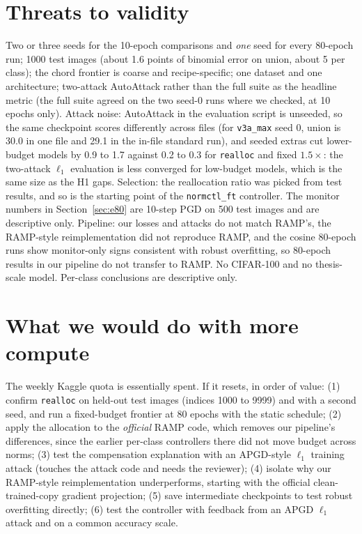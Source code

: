\documentclass[11pt]{article}
\begin{document}
\section{Threats to validity}
Two or three seeds for the 10-epoch comparisons and \emph{one} seed for every 80-epoch run; 1000 test images (about 1.6 points of binomial error on union, about 5 per class); the chord frontier is coarse and recipe-specific;
one dataset and one architecture; two-attack AutoAttack rather than the full suite as the headline metric (the full suite agreed on the two seed-0 runs where we checked, at 10 epochs only).
Attack noise: AutoAttack in the evaluation script is unseeded, so the same checkpoint scores differently across files (for \texttt{v3a\_max} seed 0, union is 30.0 in one file and 29.1 in the in-file standard run), and seeded extras cut lower-budget models by 0.9 to 1.7 against 0.2 to 0.3 for \texttt{realloc} and fixed $1.5\times$: the two-attack $\ell_1$ evaluation is less converged for low-budget models, which is the same size as the H1 gaps.
Selection: the reallocation ratio was picked from test results, and so is the starting point of the \texttt{normctl\_ft} controller. The monitor numbers in Section~\ref{sec:e80} are 10-step PGD on 500 test images and are descriptive only.
Pipeline: our losses and attacks do not match RAMP's, the RAMP-style reimplementation did not reproduce RAMP, and the cosine 80-epoch runs show monitor-only signs consistent with robust overfitting, so 80-epoch results in our pipeline do not transfer to RAMP. No CIFAR-100 and no thesis-scale model. Per-class conclusions are descriptive only.

\section{What we would do with more compute}
The weekly Kaggle quota is essentially spent. If it resets, in order of value: (1) confirm \texttt{realloc} on held-out test images (indices 1000 to 9999) and with a second seed, and run a fixed-budget frontier at 80 epochs with the static schedule;
(2) apply the allocation to the \emph{official} RAMP code, which removes our pipeline's differences, since the earlier per-class controllers there did not move budget across norms; (3) test the compensation explanation with an APGD-style $\ell_1$ training attack (touches the attack code and needs the reviewer);
(4) isolate why our RAMP-style reimplementation underperforms, starting with the official clean-trained-copy gradient projection; (5) save intermediate checkpoints to test robust overfitting directly; (6) test the controller with feedback from an APGD $\ell_1$ attack and on a common accuracy scale.
\end{document}
